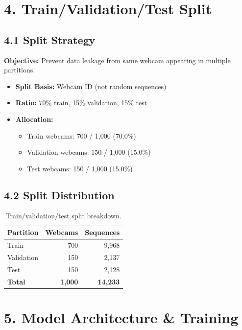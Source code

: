 \documentclass[11pt,a4paper]{article}
\begin{document}
\section{4. Train/Validation/Test Split}

\subsection{4.1 Split Strategy}

\textbf{Objective:} Prevent data leakage from same webcam appearing in multiple partitions.

\begin{itemize}
    \item \textbf{Split Basis:} Webcam ID (not random sequences)
    \item \textbf{Ratio:} 70\% train, 15\% validation, 15\% test
    \item \textbf{Allocation:}
    \begin{itemize}
        \item Train webcams: 700 / 1,000 (70.0\%)
        \item Validation webcams: 150 / 1,000 (15.0\%)
        \item Test webcams: 150 / 1,000 (15.0\%)
    \end{itemize}
\end{itemize}

\subsection{4.2 Split Distribution}

\begin{table}[h]
\centering
\begin{tabular}{lrr}
\toprule
\textbf{Partition} & \textbf{Webcams} & \textbf{Sequences} \\
\midrule
Train & 700 & 9,968 \\
Validation & 150 & 2,137 \\
Test & 150 & 2,128 \\
\midrule
\textbf{Total} & \textbf{1,000} & \textbf{14,233} \\
\bottomrule
\end{tabular}
\caption{Train/validation/test split breakdown.}
\end{table}

\section{5. Model Architecture \& Training}
\end{document}
